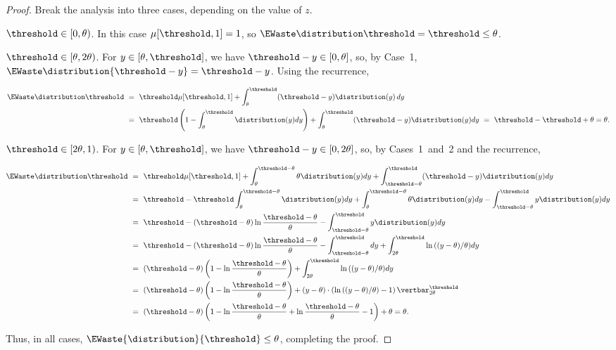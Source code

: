 \begin{proof}
\noindent
Break the analysis into three cases, depending on the value of $z$.

\medskip
\noindent
{} $\threshold\in [0,\theta)$. In this case $\mu[\threshold,1] = 1$, 
  so $\EWaste \distribution \threshold = \threshold \le \theta$.

\medskip
\noindent
{} $\threshold\in [\theta,2\theta)$.
  For $y\in [\theta, \threshold]$, we have $\threshold-y\in[0,\theta]$,
  so, by Case~1, $\EWaste \distribution {\threshold-y} = \threshold-y$.
  Using the recurrence, 

\begin{align*}
	\EWaste \distribution \threshold ~&=~ 
   \threshold \mu[\threshold,1]+\int_{\theta}^\threshold (\threshold-y)\distribution(y)\,dy
\\
   ~&=~ \threshold\left(1-\int_{\theta}^\threshold \distribution(y)dy\right)+\int_{\theta}^\threshold (\threshold-y)\distribution(y)dy
   ~=~ \threshold -\threshold+\theta=\theta.
\end{align*}
 
\medskip
\noindent
{} $\threshold\in [2\theta,1)$.
 For $y\in [\theta, \threshold]$, we have $\threshold-y\in [0,2\theta]$,
 so, by Cases~1~and~2 and the recurrence,

\begin{align*}
\EWaste \distribution \threshold
   &~=~ \threshold \mu[\threshold,1]
				+\int_{\theta}^{\threshold-\theta} \theta \distribution(y)dy
				+\int_{\threshold-\theta}^{\threshold} (\threshold-y)\distribution(y)dy
\\
  &~=~ \threshold-\threshold\int_{\theta}^{\threshold-\theta}\distribution(y)dy	
				+\int_{\theta}^{\threshold-\theta} \theta \distribution(y)dy
				-\int_{\threshold-\theta}^{\threshold} y\distribution(y)dy
\\
   &~=~\threshold-(\threshold-\theta)\ln{\frac{\threshold-\theta}{\theta}}
				-\int_{\threshold-\theta}^{\threshold} y\distribution(y)dy
\\
   &~=~ \threshold-(\threshold-\theta)\ln{\frac{\threshold-\theta}{\theta}}
				-\int_{\threshold-\theta}^{\threshold} dy
				+\int_{2\theta}^{\threshold}  \ln{\left((y-\theta)/\theta\right)} dy
\\
   &~=~ (\threshold-\theta)\left(1-\ln{\frac{\threshold-\theta}{\theta}}\right)
			+\int_{2\theta}^{\threshold}  \ln{\left((y-\theta)/\theta\right)} dy
\\
 &~=~(\threshold-\theta)\left(1-\ln{\frac{\threshold-\theta}{\theta}}\right)
				+\left(y-\theta)\cdot (\ln{\left((y-\theta)/\theta\right)}-1\right)\vertbar_{2\theta}^\threshold
\\
   &~=~(\threshold-\theta) 
        \left(
          1-\ln{\frac{\threshold-\theta}{\theta}}
          +\ln{\frac{\threshold-\theta}{\theta}}-1
        \right)
        + \theta 
        =\theta.
\end{align*}

Thus, in all cases, $\EWaste{\distribution}{\threshold}\le\theta$,
completing the proof.
\end{proof}



